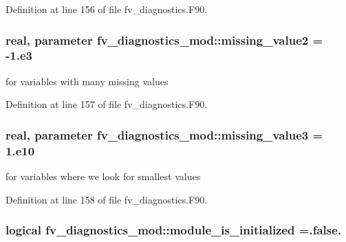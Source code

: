 Definition at line 156 of file fv\-\_\-diagnostics.\-F90.

\subsubsection[{missing\-\_\-value2}]{\setlength{\rightskip}{0pt plus 5cm}real, parameter fv\-\_\-diagnostics\-\_\-mod\-::missing\-\_\-value2 = -\/1.e3\hspace{0.3cm}{\ttfamily [private]}}\label{classfv__diagnostics__mod_a0c2b1829b03a7fb093b3d4166de5394a}


for variables with many missing values 



Definition at line 157 of file fv\-\_\-diagnostics.\-F90.

\subsubsection[{missing\-\_\-value3}]{\setlength{\rightskip}{0pt plus 5cm}real, parameter fv\-\_\-diagnostics\-\_\-mod\-::missing\-\_\-value3 = 1.e10\hspace{0.3cm}{\ttfamily [private]}}\label{classfv__diagnostics__mod_a8751fd73bba3e1f6cd852633004b7753}


for variables where we look for smallest values 



Definition at line 158 of file fv\-\_\-diagnostics.\-F90.

\subsubsection[{module\-\_\-is\-\_\-initialized}]{\setlength{\rightskip}{0pt plus 5cm}logical fv\-\_\-diagnostics\-\_\-mod\-::module\-\_\-is\-\_\-initialized =.false.\hspace{0.3cm}{\ttfamily [private]}}\label{classfv__diagnostics__mod_a3f48dc8f540ea0ac0363168cffaf752c}


